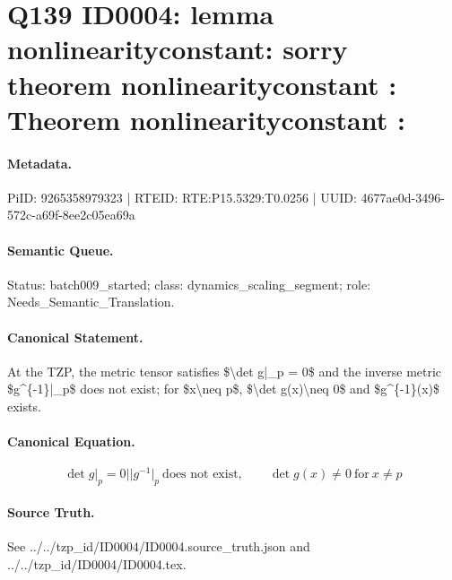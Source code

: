 \section*{Q139 ID0004: lemma nonlinearityconstant: sorry theorem nonlinearityconstant : Theorem nonlinearityconstant :}
\paragraph{Metadata.}
PiID: 9265358979323 | RTEID: RTE:P15.5329:T0.0256 | UUID: 4677ae0d-3496-572c-a69f-8ee2c05ea69a

\paragraph{Semantic Queue.}
Status: batch009\_started; class: dynamics\_scaling\_segment; role: Needs\_Semantic\_Translation.

\paragraph{Canonical Statement.}
At the TZP, the metric tensor satisfies \$\textbackslash{}det g|\_p = 0\$ and the inverse metric \$g\textasciicircum{}\{-1\}|\_p\$ does not exist; for \$x\textbackslash{}neq p\$, \$\textbackslash{}det g(x)\textbackslash{}neq 0\$ and \$g\textasciicircum{}\{-1\}(x)\$ exists.

\paragraph{Canonical Equation.}
\[
\det g\vert_{p}=0 || g^{-1}\vert_{p}\ \text{does not exist}, \qquad \det g(x)\neq 0 \ \text{for}\ x\neq p
\]

\paragraph{Source Truth.}
See ../../tzp\_id/ID0004/ID0004.source\_truth.json and ../../tzp\_id/ID0004/ID0004.tex.
